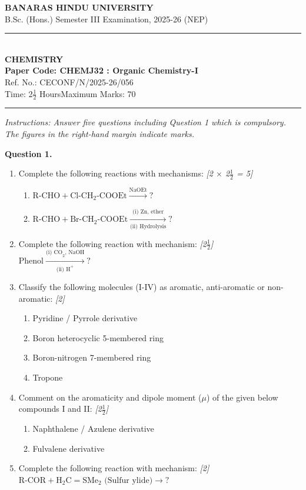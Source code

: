 \documentclass[11pt,a4paper]{article}
\newcommand{\pts}[1]{\hfill \textit{[#1]}}
\begin{document}
\begin{center}
  {\large\bfseries BANARAS HINDU UNIVERSITY}\\[2pt]
  {\normalsize B.Sc. (Hons.) Semester III Examination, 2025-26 (NEP)}\\[6pt]
  \rule{0.8\linewidth}{0.5pt}\\[6pt]
  {\large\bfseries CHEMISTRY}\\[4pt]
  {\large\bfseries Paper Code: CHEMJ32 : Organic Chemistry-I}\\[2pt]
  {\small Ref. No.: CECONF/N/2025-26/056}\\[4pt]
  {\normalsize Time: 2$\frac{1}{2}$ Hours\hfill Maximum Marks: 70}
\end{center}

\rule{\linewidth}{0.4pt}

\smallskip

\noindent \textit{Instructions: Answer five questions including Question 1 which is compulsory. The figures in the right-hand margin indicate marks.}

\bigskip

\noindent \textbf{Question 1.}
\begin{enumerate}[label=(\alph*)]
  \item Complete the following reactions with mechanisms: \pts{2 $\times$ 2$\frac{1}{2}$ = 5}
  \begin{enumerate}[label=(\roman*)]
    \item $\text{R-CHO} + \text{Cl-CH}_2\text{-COOEt} \xrightarrow{\text{NaOEt}} ?$
    \item $\text{R-CHO} + \text{Br-CH}_2\text{-COOEt} \xrightarrow[\text{(ii) Hydrolysis}]{\text{(i) Zn, ether}} ?$
  \end{enumerate}
  \item Complete the following reaction with mechanism: \pts{2$\frac{1}{2}$}\\
  $\text{Phenol} \xrightarrow[\text{(ii) H}^+]{\text{(i) CO}_2\text{, NaOH}} ?$
  \item Classify the following molecules (I-IV) as aromatic, anti-aromatic or non-aromatic: \pts{2}
  \begin{enumerate}[label=(\roman*)]
    \item Pyridine / Pyrrole derivative
    \item Boron heterocyclic 5-membered ring
    \item Boron-nitrogen 7-membered ring
    \item Tropone
  \end{enumerate}
  \item Comment on the aromaticity and dipole moment ($\mu$) of the given below compounds I and II: \pts{2$\frac{1}{2}$}
  \begin{enumerate}[label=(\roman*)]
    \item Naphthalene / Azulene derivative
    \item Fulvalene derivative
  \end{enumerate}
  \item Complete the following reaction with mechanism: \pts{2}\\
  $\text{R-COR} + \text{H}_2\text{C}=\text{SMe}_2 \text{ (Sulfur ylide)} \rightarrow ?$
\end{enumerate}
\end{document}
